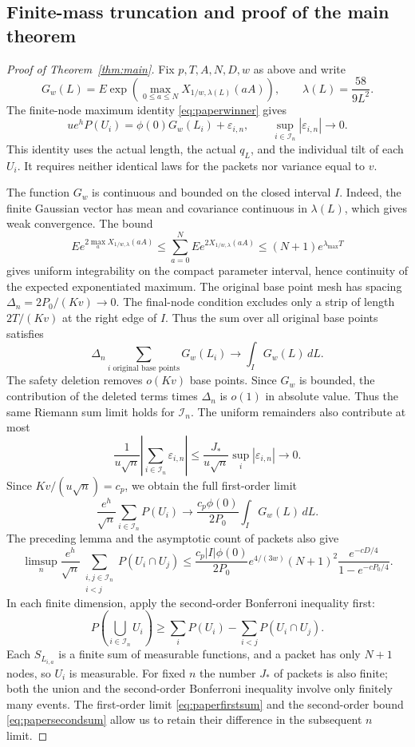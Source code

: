 \documentclass[a4paper,11pt]{article}
\theoremstyle{remark}
\begin{document}
\subsection{Finite-mass truncation and proof of the main theorem}
\begin{proof}[Proof of Theorem~\ref{thm:main}]
Fix $p,T,A,N,D,w$ as above and write
\[
 G_w(L)=E\exp\!\left(\max_{0\le a\le N}
 X_{1/w,\lambda(L)}(aA)\right),\qquad
 \lambda(L)=\frac{58}{9L^2}.
\]
The finite-node maximum identity \eqref{eq:paperwinner} gives
\[
 ue^hP(U_i)=\phi(0)G_w(L_i)+\varepsilon_{i,n},
 \qquad\sup_{i\in\mathcal I_n}|\varepsilon_{i,n}|\longrightarrow0.
\]
This identity uses the actual length, the actual $q_{L}$, and the individual tilt of each $U_i$.
It requires neither identical laws for the packets nor variance equal to $v$.

The function $G_w$ is continuous and bounded on the closed interval $I$. Indeed, the finite Gaussian vector
has mean and covariance continuous in $\lambda(L)$, which gives weak convergence. The bound
\[
 E e^{2\max_aX_{1/w,\lambda}(aA)}
 \le\sum_{a=0}^NEe^{2X_{1/w,\lambda}(aA)}
 \le(N+1)e^{\lambda_{\max}T}
\]
gives uniform integrability on the compact parameter interval, hence continuity of the expected exponentiated maximum.
The original base point mesh has spacing $\Delta_n=2P_0/(Kv)\to0$. The final-node condition excludes only
a strip of length $2T/(Kv)$ at the right edge of $I$. Thus the sum over all original base points satisfies
\[
 \Delta_n\sum_{i\text{ original base points}}G_w(L_i)\longrightarrow\int_I G_w(L)\,dL.
\]
The safety deletion removes $o(Kv)$ base points. Since $G_w$ is bounded, the contribution of the deleted terms times $\Delta_n$
is $o(1)$ in absolute value. Thus the same Riemann sum limit holds for $\mathcal I_n$.
The uniform remainders also contribute at most
\[
 \frac1{u\sqrt n}\left|\sum_{i\in\mathcal I_n}\varepsilon_{i,n}\right|
 \le\frac{J_*}{u\sqrt n}\sup_i|\varepsilon_{i,n}|\longrightarrow0.
\]
Since $Kv/(u\sqrt n)=c_p$, we obtain the full first-order limit
\begin{equation}\label{eq:paperfirstsum}
 \frac{e^h}{\sqrt n}\sum_{i\in\mathcal I_n}P(U_i)
 \longrightarrow\frac{c_p\phi(0)}{2P_0}\int_I G_w(L)\,dL.
\end{equation}
The preceding lemma and the asymptotic count of packets also give
\begin{equation}\label{eq:papersecondsum}
 \limsup_n\frac{e^h}{\sqrt n}
 \sum_{\substack{i,j\in\mathcal I_n\\i<j}}P(U_i\cap U_j)
 \le\frac{c_p|I|\phi(0)}{2P_0}e^{4/(3w)}(N+1)^2
 \frac{e^{-cD/4}}{1-e^{-cP_0/4}}.
\end{equation}
In each finite dimension, apply the second-order Bonferroni inequality first:
\[
 P\left(\bigcup_{i\in\mathcal I_n}U_i\right)
 \ge\sum_iP(U_i)-\sum_{i<j}P(U_i\cap U_j).
\]
Each $S_{L_{i,a}}$ is a finite sum of measurable functions, and a packet has only $N+1$ nodes,
so $U_i$ is measurable. For fixed $n$ the number $J_*$ of packets is also finite; both the union and
the second-order Bonferroni inequality involve only finitely many events.
The first-order limit \eqref{eq:paperfirstsum} and the second-order bound \eqref{eq:papersecondsum}
allow us to retain their difference in the subsequent $n$ limit.


\end{proof}
\end{document}
